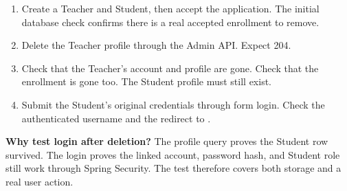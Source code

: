 \begin{enumerate}
\item Create a Teacher and Student, then accept the application. The initial
database check confirms there is a real accepted enrollment to remove.
\item Delete the Teacher profile through the Admin API. Expect 204.
\item Check that the Teacher's account and profile are gone. Check that the
enrollment is gone too. The Student profile must still exist.
\item Submit the Student's original credentials through form login. Check the
authenticated username and the redirect to .
\end{enumerate}

\textbf{Why test login after deletion?}
The profile query proves the Student row survived. The login proves the linked
account, password hash, and Student role still work through Spring Security.
The test therefore covers both storage and a real user action.

